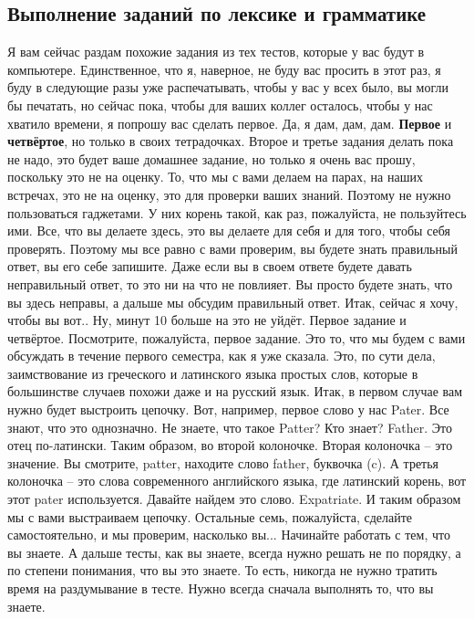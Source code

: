 \documentclass[main.tex]{subfiles}
\begin{document}
\subsection{Выполнение заданий по лексике и грамматике}

Я вам сейчас раздам похожие задания из тех тестов, которые у вас будут в компьютере.
Единственное, что я, наверное, не буду вас просить в этот раз, я буду в следующие разы уже распечатывать, чтобы у вас у всех было, вы могли бы печатать, но сейчас пока, чтобы для ваших коллег осталось, чтобы у нас хватило времени, я попрошу вас сделать первое.
Да, я дам, дам, дам.
\textbf{Первое} и \textbf{четвёртое}, но только в своих тетрадочках.
Второе и третье задания делать пока не надо, это будет ваше домашнее задание, но только я очень вас прошу, поскольку это не на оценку.
То, что мы с вами делаем на парах, на наших встречах, это не на оценку, это для проверки ваших знаний.
Поэтому не нужно пользоваться гаджетами.
У них корень такой, как раз, пожалуйста, не пользуйтесь ими.
Все, что вы делаете здесь, это вы делаете для себя и для того, чтобы себя проверять.
Поэтому мы все равно с вами проверим, вы будете знать правильный ответ, вы его себе запишите.
Даже если вы в своем ответе будете давать неправильный ответ, то это ни на что не повлияет.
Вы просто будете знать, что вы здесь неправы, а дальше мы обсудим правильный ответ.
Итак, сейчас я хочу, чтобы вы вот..
Ну, минут 10 больше на это не уйдёт.
Первое задание и четвёртое.
Посмотрите, пожалуйста, первое задание.
Это то, что мы будем с вами обсуждать в течение первого семестра, как я уже сказала.
Это, по сути дела, заимствование из греческого и латинского языка простых слов, которые в большинстве случаев похожи даже и на русский язык.
Итак, в первом случае вам нужно будет выстроить цепочку.
Вот, например, первое слово у нас Pater.
Все знают, что это однозначно.
Не знаете, что такое Patter? Кто знает? Father.
Это отец по-латински.
Таким образом, во второй колоночке.
Вторая колоночка -- это значение.
Вы смотрите, patter, находите слово father, буквочка (c).
А третья колоночка -- это слова современного английского языка, где латинский корень, вот этот pater используется.
Давайте найдем это слово.
Expatriate.
И таким образом мы с вами выстраиваем цепочку.
Остальные семь, пожалуйста, сделайте самостоятельно, и мы проверим, насколько вы...
Начинайте работать с тем, что вы знаете.
А дальше тесты, как вы знаете, всегда нужно решать не по порядку, а по степени понимания, что вы это знаете.
То есть, никогда не нужно тратить время на раздумывание в тесте.
Нужно всегда сначала выполнять то, что вы знаете.
\end{document}
